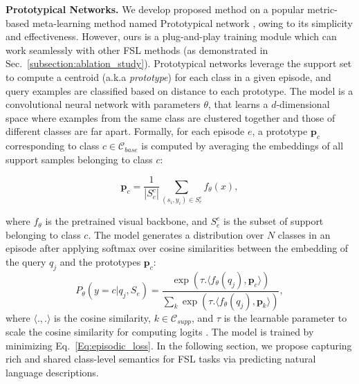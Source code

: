 \documentclass{bmvc2k}
\begin{document}
\noindent \textbf{Prototypical Networks.} We develop proposed method on a popular metric-based meta-learning method named Prototypical network \cite{snell2017prototypical}, owing to its simplicity and effectiveness. However, ours is a plug-and-play training module which can work seamlessly with other FSL methods (as demonstrated in Sec.~\ref{subsection:ablation_study}). Prototypical networks leverage the support set to compute a centroid (a.k.a \emph{prototype}) for each class in a given episode, and query examples are classified based on distance to each prototype. The model is a convolutional neural network with parameters $\theta$, that learns a $d$-dimensional space where examples from the same class are clustered together and those of different classes are far apart. Formally, for each episode $e$, a prototype $\textbf{p}_{c}$ corresponding to class $c \in \mathcal{C}_{base}$ is computed by averaging the embeddings of all support samples belonging to class $c$:

\begin{equation}
    \textbf{p}_{c}=\frac{1}{|S_{e}^{c}|}\sum_{(s_{i},y_{i}) \in S_{e}^{c}} f_\theta (x), \label{Eq:proto_compute}
\end{equation}

\noindent where $f_\theta$ is the pretrained visual backbone, and $S_{e}^{c}$ is the subset of support belonging to class $c$. The model generates a distribution over $N$ classes in an episode after applying softmax over cosine similarities between the embedding of the query $q_{j}$ and the prototypes $\textbf{p}_{c}$:
\begin{equation}
    P_{\theta}(y = c| q_{j}, S_{e}) = \frac{ \exp(\tau.\langle f_{\theta}(q_{j}), \textbf{p}_{c}\rangle)}{\sum_{k}\exp(\tau.\langle f_{\theta}(q_{j}), \textbf{p}_{k} \rangle)}, 
    \label{Eq:proto_classify}
\end{equation}
\noindent where $\langle.,.\rangle$ is the cosine similarity, $k \in \mathcal{C}_{supp}$, and $\tau$ is the learnable parameter to scale the cosine similarity for computing logits \cite{chen2020new}. The model is trained by minimizing Eq.~\ref{Eq:episodic_loss}.
In the following section, we propose capturing rich and shared class-level semantics for FSL tasks via predicting natural language descriptions.
\end{document}
